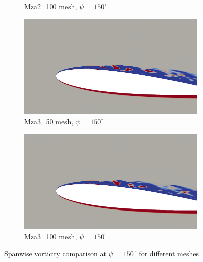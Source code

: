 \begin{figure}[H]
\begin{subfigure}[b]{0.475\textwidth}
		\caption{Mza2\_100 mesh, $\psi$ = $150^\circ$}
		\label{fig:Mza2_100_sp_psi150}
	\end{subfigure}
	\begin{subfigure}[b]{0.475\textwidth}
		\centering
		\includegraphics[width=1\textwidth]{figures/zonal_adapt_results/vorticity_plots/v2/Mza3_50/spavg/phase_150.png}
		\caption{Mza3\_50 mesh, $\psi$ = $150^\circ$}
		\label{fig:Mza3_100_sp_psi150}
	\end{subfigure}
	\begin{subfigure}[b]{0.475\textwidth}
		\centering
		\includegraphics[width=1\textwidth]{figures/zonal_adapt_results/vorticity_plots/v2/Mza3_100/spavg/phase_150.png}
		\caption{Mza3\_100 mesh, $\psi$ = $150^\circ$}
		\label{fig:Mza3_100_sp_psi150}
	\end{subfigure}
	\caption{Spanwise vorticity comparison at $\psi$ = $150^\circ$ for different meshes}
	\label{fig:vorticity_zonal_150}
\end{figure}






